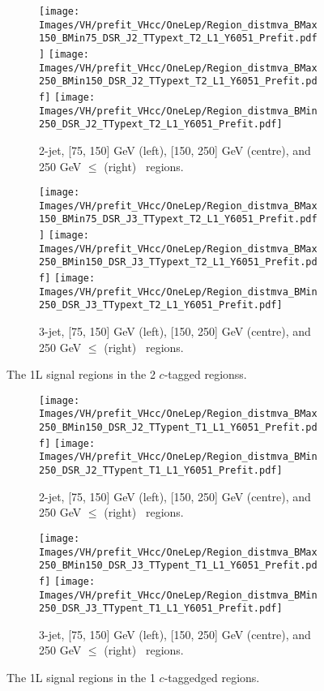 \begin{figure}[h!]
    \centering
    \begin{subfigure}[b]{\textwidth}
        \centering
        \texttt{[image: Images/VH/prefit\_VHcc/OneLep/Region\_distmva\_BMax150\_BMin75\_DSR\_J2\_TTypext\_T2\_L1\_Y6051\_Prefit.pdf]}
        \texttt{[image: Images/VH/prefit\_VHcc/OneLep/Region\_distmva\_BMax250\_BMin150\_DSR\_J2\_TTypext\_T2\_L1\_Y6051\_Prefit.pdf]}
        \texttt{[image: Images/VH/prefit\_VHcc/OneLep/Region\_distmva\_BMin250\_DSR\_J2\_TTypext\_T2\_L1\_Y6051\_Prefit.pdf]}
        \caption{2-jet, [75, 150] GeV (left), [150, 250] GeV (centre), and 250  GeV $\leq$ (right) \ptv\ regions.}
        \label{fig:plots_VHcc_1L_SR_2J_2c}
    \end{subfigure}
    \begin{subfigure}[b]{\textwidth}
        \centering
        \texttt{[image: Images/VH/prefit\_VHcc/OneLep/Region\_distmva\_BMax150\_BMin75\_DSR\_J3\_TTypext\_T2\_L1\_Y6051\_Prefit.pdf]}
        \texttt{[image: Images/VH/prefit\_VHcc/OneLep/Region\_distmva\_BMax250\_BMin150\_DSR\_J3\_TTypext\_T2\_L1\_Y6051\_Prefit.pdf]}
        \texttt{[image: Images/VH/prefit\_VHcc/OneLep/Region\_distmva\_BMin250\_DSR\_J3\_TTypext\_T2\_L1\_Y6051\_Prefit.pdf]}
        \caption{3-jet, [75, 150] GeV (left), [150, 250] GeV (centre), and 250  GeV $\leq$ (right) \ptv\ regions.}
        \label{fig:plots_VHcc_1L_SR_3J_2c}
    \end{subfigure}
    \caption{The 1L signal regions in the 2 $c$-tagged regionss.}
    \label{fig:plots_VHcc_1L_SR_2c}
\end{figure}
\begin{figure}[h!]
    \centering
    \begin{subfigure}[b]{\textwidth}
        \centering
        \texttt{[image: Images/VH/prefit\_VHcc/OneLep/Region\_distmva\_BMax250\_BMin150\_DSR\_J2\_TTypent\_T1\_L1\_Y6051\_Prefit.pdf]}
        \texttt{[image: Images/VH/prefit\_VHcc/OneLep/Region\_distmva\_BMin250\_DSR\_J2\_TTypent\_T1\_L1\_Y6051\_Prefit.pdf]}
        \caption{2-jet, [75, 150] GeV (left), [150, 250] GeV (centre), and 250  GeV $\leq$ (right) \ptv\ regions.}
        \label{fig:plots_VHcc_1L_SR_2J_1c}
    \end{subfigure}
    \begin{subfigure}[b]{\textwidth}
        \centering
        \texttt{[image: Images/VH/prefit\_VHcc/OneLep/Region\_distmva\_BMax250\_BMin150\_DSR\_J3\_TTypent\_T1\_L1\_Y6051\_Prefit.pdf]}
        \texttt{[image: Images/VH/prefit\_VHcc/OneLep/Region\_distmva\_BMin250\_DSR\_J3\_TTypent\_T1\_L1\_Y6051\_Prefit.pdf]}
        \caption{3-jet, [75, 150] GeV (left), [150, 250] GeV (centre), and 250  GeV $\leq$ (right) \ptv\ regions.}
        \label{fig:plots_VHcc_1L_SR_3J_1c}
    \end{subfigure}
    \caption{The 1L signal regions in the 1 $c$-taggedged regions.}
    \label{fig:plots_VHcc_1L_SR_1c}
\end{figure}

